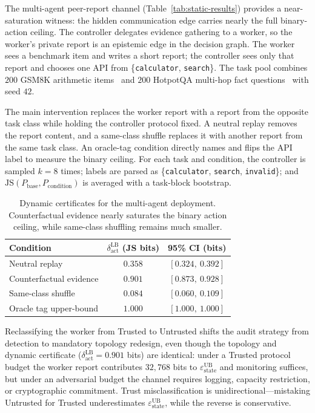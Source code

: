 \documentclass{article}
\begin{document}
The multi-agent peer-report channel (Table~\ref{tab:static-results}) provides a near-saturation witness: the hidden communication edge carries nearly the full binary-action ceiling. The controller delegates evidence gathering to a worker, so the worker's private report is an epistemic edge in the decision graph. The worker sees a benchmark item and writes a short report; the controller sees only that report and chooses one API from \{\texttt{calculator}, \texttt{search}\}. The task pool combines $200$ GSM8K arithmetic items~\citep{cobbe2021training} and $200$ HotpotQA multi-hop fact questions~\citep{yang2018hotpotqa} with seed $42$.

The main intervention replaces the worker report with a report from the opposite task class while holding the controller protocol fixed. A neutral replay removes the report content, and a same-class shuffle replaces it with another report from the same task class. An oracle-tag condition directly names and flips the API label to measure the binary ceiling. For each task and condition, the controller is sampled $k{=}8$ times; labels are parsed as \{\texttt{calculator}, \texttt{search}, \texttt{invalid}\}; and $\mathrm{JS}(P_\text{base},P_\text{condition})$ is averaged with a task-block bootstrap.

\begin{table}[t]
\centering
\begin{tabular}{lcc}
\toprule
Condition & $\delta_\text{act}^\text{LB}$ (JS bits) & 95\% CI (bits) \\
\midrule
Neutral replay & $0.358$ & $[0.324,\ 0.392]$ \\
Counterfactual evidence & $0.901$ & $[0.873,\ 0.928]$ \\
Same-class shuffle & $0.084$ & $[0.060,\ 0.109]$ \\
Oracle tag upper-bound & $1.000$ & $[1.000,\ 1.000]$ \\
\bottomrule
\end{tabular}
\caption{Dynamic certificates for the multi-agent deployment. Counterfactual evidence nearly saturates the binary action ceiling, while same-class shuffling remains much smaller.}
\label{tab:multi-agent-dynamic}
\end{table}

Reclassifying the worker from Trusted to Untrusted shifts the audit strategy from detection to mandatory topology redesign, even though the topology and dynamic certificate ($\delta_\text{act}^\text{LB}=0.901$ bits) are identical: under a Trusted protocol budget the worker report contributes $32{,}768$ bits to $\varepsilon_\text{state}^\text{UB}$ and monitoring suffices, but under an adversarial budget the channel requires logging, capacity restriction, or cryptographic commitment. Trust misclassification is unidirectional---mistaking Untrusted for Trusted underestimates $\varepsilon_\text{state}^\text{UB}$, while the reverse is conservative.
\end{document}
